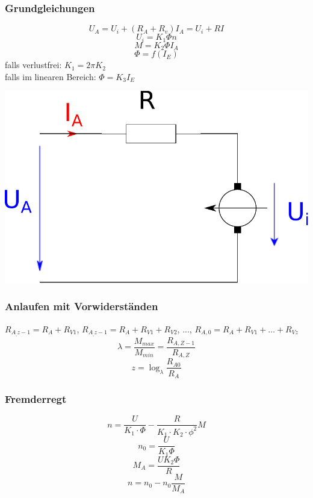 \documentclass[9pt,a4paper]{scrartcl}
\begin{document}
\begin{multicols}{3}
		\subsubsection{Grundgleichungen}
		\[U_A = U_i + (R_A + R_v) I_A = U_i + RI\]
		\[U_i = K_1 \Phi n\]
		\[M = K_2 \Phi I_A\]
		\[\Phi = f(I_E)\]
		falls verlustfrei: $K_1 = 2 \pi K_2$ \\
		falls im linearen Bereich: $\Phi = K_3 I_E$ \\
		
		\begin{center}
		\includegraphics[scale=.4]{./img/ersatzschaltbild_gleichstrommaschine.pdf}
		\end{center}
		
		\subsubsection{Anlaufen mit Vorwiderständen}
		$R_{A_,z-1} = R_A + R_{V1}$, $R_{A_,z-1} = R_A + R_{V1} + R_{V2}$, ..., $R_{A,0} = R_A + R_{V1} + \hdots + R_{Vz}$ \\
		\[\lambda = \frac{M_{max}}{M_{min}} = \frac{R_{A,Z-1}}{R_{A,Z}}\]
		\[z = \log_\lambda \frac{R_{A0}}{R_A}\]
		
		
		\subsubsection{Fremderregt}
		\[n = \frac{U}{ K_1 \cdot \Phi} - \frac{R}{K_1 \cdot K_2 \cdot \phi^2}M\]
		\[n_0 = \frac{U}{K_1 \Phi}\]
		\[M_A = \frac{U K_2 \Phi}{R}\]
		\[n = n_0 - n_0 \frac{M}{M_A}\]
		
		

\end{multicols}
\end{document}
